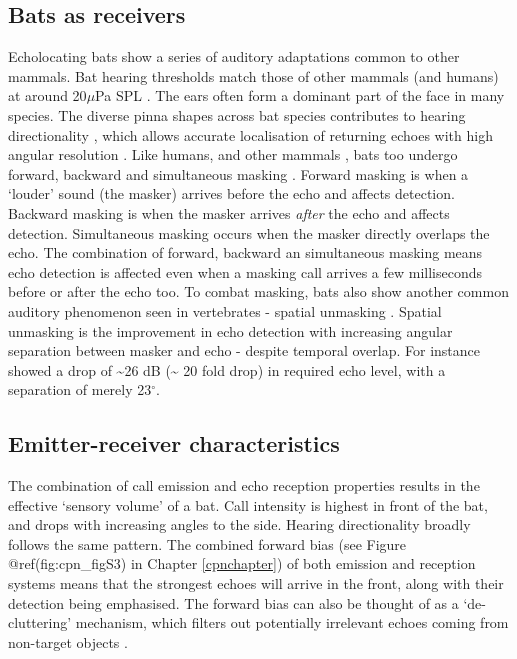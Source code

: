 \documentclass[
]{book}
\begin{document}
\hypertarget{bats-as-receivers}{%
\subsection{Bats as receivers}\label{bats-as-receivers}}

Echolocating bats show a series of auditory adaptations common to other mammals. Bat hearing thresholds match those of other mammals (and humans) at around 20\(\mu\)Pa SPL \citep{wahlberg2014sound}. The ears often form a dominant part of the face in many species. The diverse pinna shapes across bat species contributes to hearing directionality \citep{obrist1993a}, which allows accurate localisation of returning echoes with high angular resolution \citep{Moss1995}. Like humans, and other mammals , bats too undergo forward, backward and simultaneous masking \citep{m1989a, siewert2004a, suemer2009a}. Forward masking is when a `louder' sound (the masker) arrives before the echo and affects detection. Backward masking is when the masker arrives \emph{after} the echo and affects detection. Simultaneous masking occurs when the masker directly overlaps the echo. The combination of forward, backward an simultaneous masking means echo detection is affected even when a masking call arrives a few milliseconds before or after the echo too. To combat masking, bats also show another common auditory phenomenon seen in vertebrates - spatial unmasking \citep{suemer2009a, geberl2019spatial}. Spatial unmasking is the improvement in echo detection with increasing angular separation between masker and echo - despite temporal overlap. For instance \citet{suemer2009a} showed a drop of \textasciitilde26 dB (\textasciitilde{} 20 fold drop) in required echo level, with a separation of merely 23\(^{\circ}\).

\hypertarget{emitter-receiver-characteristics}{%
\subsection{Emitter-receiver characteristics}\label{emitter-receiver-characteristics}}

The combination of call emission and echo reception properties results in the effective `sensory volume' \citep{nelson2006a} of a bat. Call intensity is highest in front of the bat, and drops with increasing angles to the side. Hearing directionality broadly follows the same pattern. The combined forward bias (see Figure @ref(fig:cpn\_figS3) in Chapter \ref{cpnchapter}) of both emission and reception systems means that the strongest echoes will arrive in the front, along with their detection being emphasised. The forward bias can also be thought of as a `de-cluttering' mechanism, which filters out potentially irrelevant echoes coming from non-target objects \citep{simmons2012biosonar}.
\end{document}
